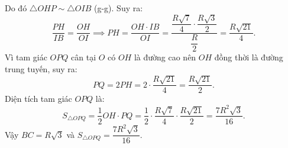 \begin{bt}
{\begin{enumerate}[a)]
	Do đó $\triangle OHP \sim \triangle OIB$ (g-g).
	Suy ra:
	$$\dfrac{PH}{IB} = \dfrac{OH}{OI} \implies PH = \dfrac{OH \cdot IB}{OI} = \dfrac{\dfrac{R\sqrt{7}}{4} \cdot \dfrac{R\sqrt{3}}{2}}{\dfrac{R}{2}} = \dfrac{R\sqrt{21}}{4}.$$
	Vì tam giác $OPQ$ cân tại $O$ có $OH$ là đường cao nên $OH$ đồng thời là đường trung tuyến, suy ra:
	$$PQ = 2PH = 2 \cdot \dfrac{R\sqrt{21}}{4} = \dfrac{R\sqrt{21}}{2}.$$
	Diện tích tam giác $OPQ$ là:
	$$S_{\triangle OPQ} = \dfrac{1}{2} OH \cdot PQ = \dfrac{1}{2} \cdot \dfrac{R\sqrt{7}}{4} \cdot \dfrac{R\sqrt{21}}{2} = \dfrac{7R^2\sqrt{3}}{16}.$$
	Vậy $BC = R\sqrt{3}$ và $S_{\triangle OPQ} = \dfrac{7R^2\sqrt{3}}{16}$.
\end{enumerate}
}
\end{bt}

